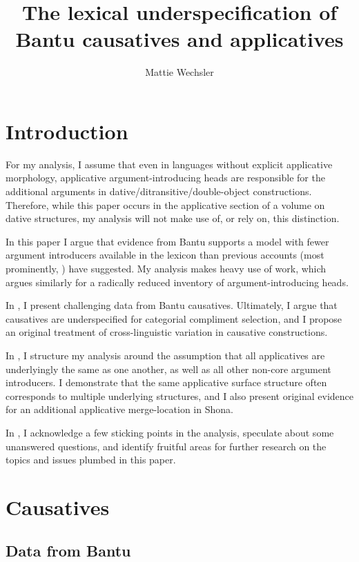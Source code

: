 \documentclass[output=paper,modfonts,nonflat]{langsci/langscibook}
\author{Mattie Wechsler\affiliation{}}
\title{The lexical underspecification of Bantu causatives and applicatives}
\begin{document}
\maketitle 


\section{Introduction}\label{sec:wechsler:1}

For my analysis, I assume that even in languages without explicit applicative morphology, applicative argument-introducing heads are responsible for the additional arguments in dative/ditransitive/double-object constructions. Therefore, while this paper occurs in the applicative section of a volume on dative structures, my analysis will not make use of, or rely on, this distinction. 

In this paper I argue that evidence from Bantu supports a model with fewer argument introducers available in the lexicon than previous accounts (most prominently, \citealt{Pylkkänen2008}) have suggested. My analysis makes heavy use of  work, which argues similarly for a radically reduced inventory of argument-introducing heads. 

In , I present challenging data from Bantu causatives. Ultimately, I argue that causatives are underspecified for categorial compliment selection, and I propose an original treatment of cross-linguistic variation in causative constructions.

In , I structure my analysis around the assumption that all applicatives are underlyingly the same as one another, as well as all other non-core argument introducers. I demonstrate that the same applicative surface structure often corresponds to multiple underlying structures, and I also present original evidence for an additional applicative merge-location in Shona. 

In , I acknowledge a few sticking points in the analysis, speculate about some unanswered questions, and identify fruitful areas for further research on the topics and issues plumbed in this paper. 

\section{Causatives}\label{sec:wechsler:2}

\subsection{Data from Bantu}\label{sec:wechsler:2.1}
\end{document}
